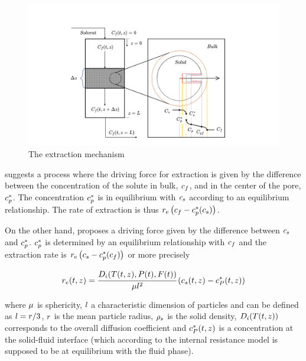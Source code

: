 \documentclass[../Article_Model_Parameters.tex]{subfiles}
\begin{document}
		\begin{figure}[h!]
			\centering
			\includegraphics[trim = 45cm 0cm 60cm 20cm,clip,width=\columnwidth]{Figures/SFE_PFD.drawio.png}	
			\caption{The extraction mechanism}
			\label{fig: SFE_Mechanism}
		\end{figure}
			
		\citet{Bulley1984} suggests a process where the driving force for extraction is given by the difference between the concentration of the solute in bulk, ${\color{black}c_f}$, and in the center of the pore, ${\color{black}c_p^*}$. The concentration ${\color{black}c_p^*}$ is in equilibrium with ${\color{black}c_s}$ according to an equilibrium relationship. The rate of extraction is thus ${\color{black}r_\text{e}}\left({\color{black}c_f} - {\color{black}c^*_p}({\color{black}c_s})\right)$.  
			
		On the other hand, \citet{Reverchon1996} proposes a driving force given by the difference between ${\color{black}c_s}$ and ${\color{black}c_p^*}$. ${\color{black}c_p^*}$ is determined by an equilibrium relationship with ${\color{black}c_f}$ and the extraction rate is ${\color{black}r_\text{e}}\left({\color{black}c_s} - {\color{black}c^*_p}({\color{black}c_f})\right)$ or more precisely
			
			{\footnotesize
				\begin{equation} \label{Model_kinetic_basic}
					{\color{black}r_e}(t,z) = \cfrac{{\color{black}D_i}({\color{black}T}(t,z), {\color{black}P}(t), F(t))}{{\color{black} \mu l^2} }\left({\color{black}c_s}(t,z) - {\color{black}c_P^*}(t,z) \right)
			\end{equation} }
			
		where ${\color{black}\mu}$ is sphericity, ${\color{black}l}$ a characteristic dimension of particles and can be defined as ${\color{black}l} = {\color{black}r}/3$, ${\color{black}r}$ is the mean particle radius, ${\color{black}\rho_s}$ is the solid density, ${\color{black}D_i}({\color{black}T}(t,z))$ corresponds to the overall diffusion coefficient and ${\color{black}c_P^*}(t,z)$ is a concentration at the solid-fluid interface (which according to the internal resistance model is supposed to be at equilibrium with the fluid phase). 
			
\end{document}
